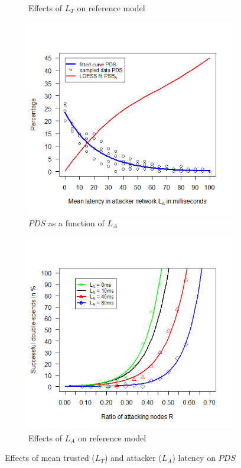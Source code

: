 \documentclass[a4paper,12pt,twoside]{report}
\begin{document}
\begin{figure}[!ht]
\begin{subfigure}{.5\textwidth}
  \caption{Effects of $L_{T}$ on reference model}
  \label{trulat:b}
\end{subfigure}
\begin{subfigure}{.5\textwidth}
  \centering
  \includegraphics[width=\linewidth]{Experiments/AttLatency/attlat.png}
  \caption{$PDS$ as a function of $L_{A}$}
  \label{attlat:a}
\end{subfigure}%
\begin{subfigure}{.5\textwidth}
  \centering
  \includegraphics[width=\linewidth]{Experiments/AttLatency/attrat.png}
  \caption{Effects of $L_{A}$ on reference model}
  \label{attlat:b}
\end{subfigure}
\caption{Effects of mean trusted ($L_{T}$) and attacker ($L_{A}$) latency on $PDS$}
\label{latplot}
\end{figure}
\end{document}
